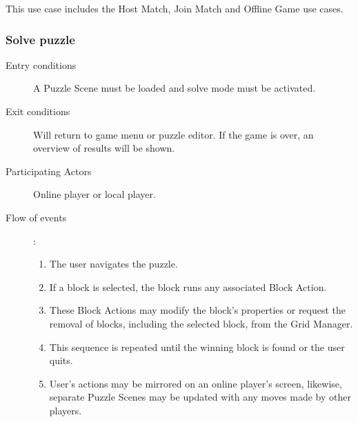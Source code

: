 \documentclass[12pt]{article}
\begin{document}
\begin{mdframed}
    This use case includes the Host Match, Join Match and Offline Game
    use cases.
    \subsubsection{Solve puzzle}
    \begin{description}
        \item[Entry conditions] A Puzzle Scene must be loaded and solve mode
            must be activated.
        \item[Exit conditions] Will return to game menu or puzzle editor.
            If the game is over, an overview of results will be shown.
        \item[Participating Actors] Online player or local player.
        \item[Flow of events]:
            \begin{enumerate}
                \item The user navigates the puzzle.
                \item If a block is selected, the block runs any associated
                    Block Action.
                \item These Block Actions may modify the block's properties or
                    request the removal of blocks, including the
                    selected block, from the Grid Manager.
                \item This sequence is repeated until the winning block is
                    found or the user quits.
                \item User's actions may be mirrored on an online player's
                    screen, likewise, separate Puzzle Scenes  may be updated
                    with any moves made by other players.
            \end{enumerate}
    \end{description}
\end{mdframed}
\end{document}
